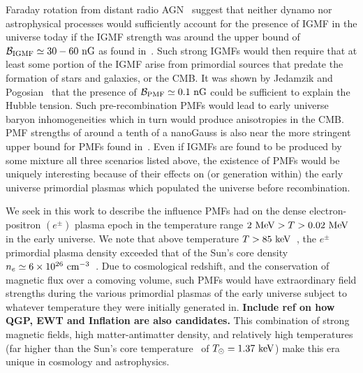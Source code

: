 \documentclass[a4paper]{article}
\begin{document}
Faraday rotation from distant radio AGN~\cite{pomakov2022redshift} suggest that neither dynamo nor astrophysical processes would sufficiently account for the presence of IGMF in the universe today if the IGMF strength was around the upper bound of ${\cal B}_{\rm IGMF}\simeq30-60{\rm\ nG}$ as found in~\cite{vernstrom2021discovery}. Such strong IGMFs would then require that at least some portion of the IGMF arise from primordial sources that predate the formation of stars and galaxies, or the CMB. It was shown by Jedamzik and Pogosian~\cite{jedamzik2020relieving} that the presence of ${\cal B}_{\rm PMF}\simeq0.1{\rm\ nG}$ could be sufficient to explain the Hubble tension. Such pre-recombination PMFs would lead to early universe baryon inhomogeneities which in turn would produce anisotropies in the CMB. PMF strengths of around a tenth of a nanoGauss is also near the more stringent upper bound for PMFs found in~\cite{jedamzik2019stringent}. Even if IGMFs are found to be produced by some mixture all three scenarios listed above, the existence of PMFs would be uniquely interesting because of their effects on (or generation within) the early universe primordial plasmas which populated the universe before recombination.

We seek in this work to describe the influence PMFs had on the dense electron-positron $(e^{\pm})$ plasma epoch in the temperature range $2\text{ MeV}>T>0.02\text{ MeV}$ in the early universe. We note that above temperature $T>85\text{ keV}$~\cite{rafelski2023short}, the $e^{\pm}$ primordial plasma density exceeded that of the Sun's core density $n_{e}\simeq6\times10^{26}{\rm\ cm}^{-3}$~\cite{bahcall2001solar}. Due to cosmological redshift, and the conservation of magnetic flux over a comoving volume, such PMFs would have extraordinary field strengths during the various primordial plasmas of the early universe subject to whatever temperature they were initially generated in. \textbf{Include ref on how QGP, EWT and Inflation are also candidates.} This combination of strong magnetic fields, high matter-antimatter density, and relatively high temperatures (far higher than the Sun's core temperature~\cite{castellani1997solar} of $T_{\odot}=1.37\text{ keV}$) make this era unique in cosmology and astrophysics.
\end{document}
